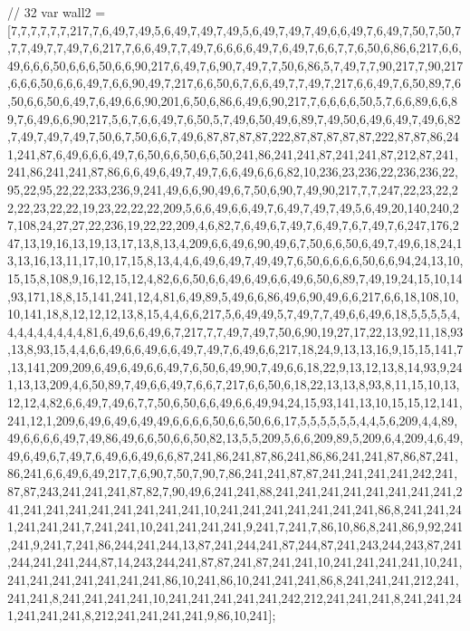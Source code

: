 // 32
var wall2 = [7,7,7,7,7,7,217,7,6,49,7,49,5,6,49,7,49,7,49,5,6,49,7,49,7,49,6,6,49,7,6,49,7,50,7,50,7,7,7,49,7,7,49,7,6,217,7,6,6,49,7,7,49,7,6,6,6,6,49,7,6,49,7,6,6,7,7,6,50,6,86,6,217,6,6,49,6,6,6,50,6,6,6,50,6,6,90,217,6,49,7,6,90,7,49,7,7,50,6,86,5,7,49,7,7,90,217,7,90,217,6,6,6,50,6,6,6,49,7,6,6,90,49,7,217,6,6,50,6,7,6,6,49,7,7,49,7,217,6,6,49,7,6,50,89,7,6,50,6,6,50,6,49,7,6,49,6,6,90,201,6,50,6,86,6,49,6,90,217,7,6,6,6,6,50,5,7,6,6,89,6,6,89,7,6,49,6,6,90,217,5,6,7,6,6,49,7,6,50,5,7,49,6,50,49,6,89,7,49,50,6,49,6,49,7,49,6,82,7,49,7,49,7,49,7,50,6,7,50,6,6,7,49,6,87,87,87,87,222,87,87,87,87,87,222,87,87,86,241,241,87,6,49,6,6,6,49,7,6,50,6,6,50,6,6,50,241,86,241,241,87,241,241,87,212,87,241,241,86,241,241,87,86,6,6,49,6,49,7,49,7,6,6,49,6,6,6,82,10,236,23,236,22,236,236,22,95,22,95,22,22,233,236,9,241,49,6,6,90,49,6,7,50,6,90,7,49,90,217,7,7,247,22,23,22,22,22,23,22,22,19,23,22,22,22,209,5,6,6,49,6,6,49,7,6,49,7,49,7,49,5,6,49,20,140,240,27,108,24,27,27,22,236,19,22,22,209,4,6,82,7,6,49,6,7,49,7,6,49,7,6,7,49,7,6,247,176,247,13,19,16,13,19,13,17,13,8,13,4,209,6,6,49,6,90,49,6,7,50,6,6,50,6,49,7,49,6,18,24,13,13,16,13,11,17,10,17,15,8,13,4,4,6,49,6,49,7,49,49,7,6,50,6,6,6,6,50,6,6,94,24,13,10,15,15,8,108,9,16,12,15,12,4,82,6,6,50,6,6,49,6,49,6,6,49,6,50,6,89,7,49,19,24,15,10,14,93,171,18,8,15,141,241,12,4,81,6,49,89,5,49,6,6,86,49,6,90,49,6,6,217,6,6,18,108,10,10,141,18,8,12,12,12,13,8,15,4,4,6,6,217,5,6,49,49,5,7,49,7,7,49,6,6,49,6,18,5,5,5,5,4,4,4,4,4,4,4,4,4,81,6,49,6,6,49,6,7,217,7,7,49,7,49,7,50,6,90,19,27,17,22,13,92,11,18,93,13,8,93,15,4,4,6,6,49,6,6,49,6,6,49,7,49,7,6,49,6,6,217,18,24,9,13,13,16,9,15,15,141,7,13,141,209,209,6,49,6,49,6,6,49,7,6,50,6,49,90,7,49,6,6,18,22,9,13,12,13,8,14,93,9,241,13,13,209,4,6,50,89,7,49,6,6,49,7,6,6,7,217,6,6,50,6,18,22,13,13,8,93,8,11,15,10,13,12,12,4,82,6,6,49,7,49,6,7,7,50,6,50,6,6,49,6,6,49,94,24,15,93,141,13,10,15,15,12,141,241,12,1,209,6,49,6,49,6,49,49,6,6,6,6,50,6,6,50,6,6,17,5,5,5,5,5,5,4,4,5,6,209,4,4,89,49,6,6,6,6,49,7,49,86,49,6,6,50,6,6,50,82,13,5,5,209,5,6,6,209,89,5,209,6,4,209,4,6,49,49,6,49,6,7,49,7,6,49,6,6,49,6,6,87,241,86,241,87,86,241,86,86,241,241,87,86,87,241,86,241,6,6,49,6,49,217,7,6,90,7,50,7,90,7,86,241,241,87,87,241,241,241,241,242,241,87,87,243,241,241,241,87,82,7,90,49,6,241,241,88,241,241,241,241,241,241,241,241,241,241,241,241,241,241,241,241,241,10,241,241,241,241,241,241,241,86,8,241,241,241,241,241,241,7,241,241,10,241,241,241,241,9,241,7,241,7,86,10,86,8,241,86,9,92,241,241,9,241,7,241,86,244,241,244,13,87,241,244,241,87,244,87,241,243,244,243,87,241,244,241,241,244,87,14,243,244,241,87,87,241,87,241,241,10,241,241,241,241,10,241,241,241,241,241,241,241,241,86,10,241,86,10,241,241,241,86,8,241,241,241,212,241,241,241,8,241,241,241,241,10,241,241,241,241,241,242,212,241,241,241,8,241,241,241,241,241,241,8,212,241,241,241,241,9,86,10,241];

